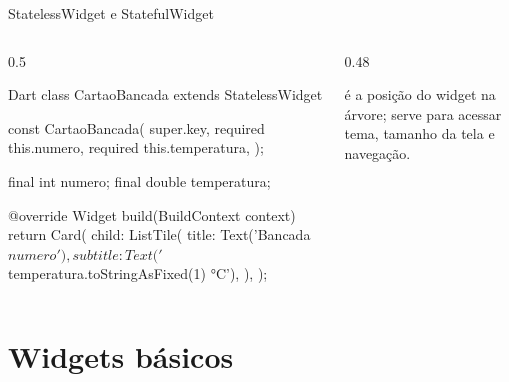 \documentclass[aspectratio=169,10pt]{beamer}
\begin{document}
\begin{frame}[fragile]{StatelessWidget e StatefulWidget}
  \begin{columns}[T]
    \begin{column}{0.5\textwidth}
\begin{codigo}[title=Sem estado]{Dart}
class CartaoBancada extends StatelessWidget {
  const CartaoBancada({
    super.key,
    required this.numero,
    required this.temperatura,
  });

  final int numero;
  final double temperatura;

  @override
  Widget build(BuildContext context) {
    return Card(
      child: ListTile(
        title: Text('Bancada $numero'),
        subtitle: Text('${temperatura.toStringAsFixed(1)} °C'),
      ),
    );
  }
}
\end{codigo}
    \end{column}
    \begin{column}{0.48\textwidth}
      \begin{dica}
         é a posição do widget na árvore; serve para acessar tema, tamanho da tela e navegação.
      \end{dica}
    \end{column}
  \end{columns}
\end{frame}

\section{Widgets básicos}
\end{document}

